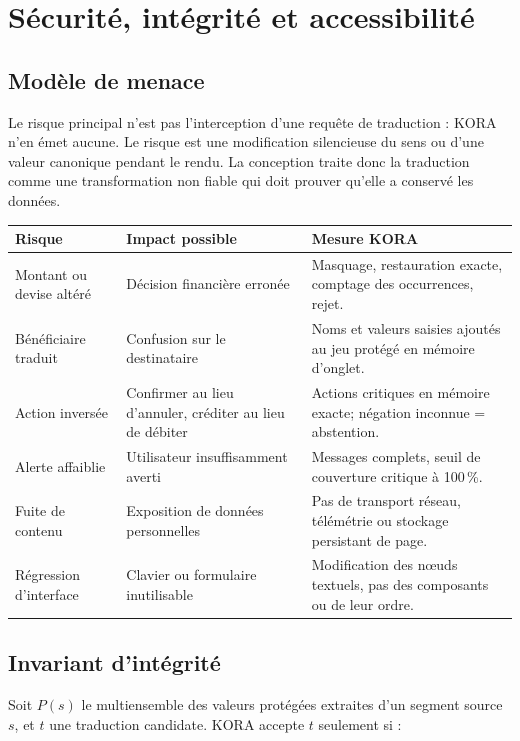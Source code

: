 \section{Sécurité, intégrité et accessibilité}

\subsection{Modèle de menace}

Le risque principal n’est pas l’interception d’une requête de traduction :
KORA n’en émet aucune. Le risque est une modification silencieuse du sens ou
d’une valeur canonique pendant le rendu. La conception traite donc la
traduction comme une transformation non fiable qui doit prouver qu’elle a
conservé les données.

\begin{tabularx}{\linewidth}{@{}|L{40mm}|Y|Y|@{}}
\hline
\textbf{Risque} & \textbf{Impact possible} & \textbf{Mesure KORA}\\
\hline
Montant ou devise altéré &
Décision financière erronée &
Masquage, restauration exacte, comptage des occurrences, rejet.\\
\hline
Bénéficiaire traduit &
Confusion sur le destinataire &
Noms et valeurs saisies ajoutés au jeu protégé en mémoire d’onglet.\\
\hline
Action inversée &
Confirmer au lieu d’annuler, créditer au lieu de débiter &
Actions critiques en mémoire exacte; négation inconnue = abstention.\\
\hline
Alerte affaiblie &
Utilisateur insuffisamment averti &
Messages complets, seuil de couverture critique à 100\,\%.\\
\hline
Fuite de contenu &
Exposition de données personnelles &
Pas de transport réseau, télémétrie ou stockage persistant de page.\\
\hline
Régression d’interface &
Clavier ou formulaire inutilisable &
Modification des nœuds textuels, pas des composants ou de leur ordre.\\
\hline
\end{tabularx}

\subsection{Invariant d’intégrité}

Soit \(P(s)\) le multiensemble des valeurs protégées extraites d’un segment
source \(s\), et \(t\) une traduction candidate. KORA accepte \(t\) seulement
si :

